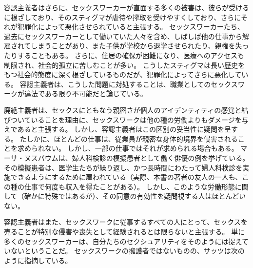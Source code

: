 \documentclass[paper=a4,book,openany]{jlreq}
\begin{document}
容認主義者はさらに、セックスワーカーが直面する多くの被害は、彼らが受けるに根ざしており、そのスティグマが虐待や搾取を受けやすくしており、さらにそれが犯罪化によって悪化させられていると主張する。
セックスワーカーたち、過去にセックスワーカーとして働いていた人々を含め、しばしば他の仕事から解雇されてしまうことがあり、また子供が学校から退学させられたり、親権を失ったりすることもある。
さらに、住居の確保が困難になり、医療へのアクセスも制限され、社会的孤立に苦しむことが多い\citep{stardust17:_stigm_sex_work_comes_high_cost}。
こうしたスティグマは長い歴史をもつ社会的態度に深く根ざしているものだが、犯罪化によってさらに悪化している。
容認主義者は、こうした問題に対処することは、職業としてのセックスワークが違法である限り不可能だと論じている。

廃絶主義者は、セックスにともなう親密さが個人のアイデンティティの感覚と結びついていることを理由に、セックスワークは他の種の労働よりもダメージを与えであると主張する。
しかし、容認主義者はこの区別の妥当性に疑問を呈する。
たしかに、ほとんどの仕事は、従業員が親密な身体的境界を侵害されることを求められない。
しかし、一部の仕事ではそれが求められる場合もある。
マーサ・ヌスバウムは、婦人科検診の模擬患者として働く俳優の例を挙げている\citep{nussbaum98:_wheth_reason_prejud}。
その模擬患者は、医学生たちが繰り返し、かつ長時間にわたって婦人科検診を実施できるようにするために雇われている（実際、本書の著者の友人の一人も、この種の仕事で何度も収入を得たことがある）。
しかし、このような労働形態に関して（確かに特殊ではあるが）、その同意の有効性を疑問視する人はほとんどいない。

容認主義者はまた、セックスワークに従事するすべての人にとって、セックスを売ることが特別な侵害や喪失として経験されるとは限らないと主張する。
単に多くのセックスワーカーは、自分たちのセクシュアリティをそのようには捉えていないということだ。
セックスワークの擁護者ではないものの、サッツは次のように指摘している。
\end{document}
